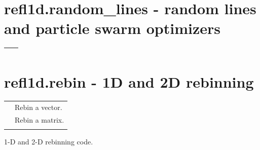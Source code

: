 \documentclass[letterpaper,10pt,english]{sphinxmanual}
\begin{document}
\section{refl1d.random\_lines - random lines and particle swarm optimizers}
\label{api/random_lines::doc}\label{api/random_lines:refl1d-random-lines-random-lines-and-particle-swarm-optimizers}
\begin{tabulary}{\linewidth}{LL}
\hline

{\hyperref[api/random_lines:refl1d.random_lines.random_lines]{}}
 & 

\\
\hline
\end{tabulary}

\label{api/random_lines:module-refl1d.random_lines}

\begin{fulllineitems}
\label{api/random_lines:refl1d.random_lines.random_lines}
\end{fulllineitems}



\section{refl1d.rebin - 1D and 2D rebinning}
\label{api/rebin:refl1d-rebin-1d-and-2d-rebinning}\label{api/rebin::doc}
\begin{tabulary}{\linewidth}{LL}
\hline

{\hyperref[api/rebin:refl1d.rebin.rebin]{}}
 & 
Rebin a vector.
\\

{\hyperref[api/rebin:refl1d.rebin.rebin2d]{}}
 & 
Rebin a matrix.
\\

{\hyperref[api/rebin:refl1d.rebin.test]{}}
 & 

\\
\hline
\end{tabulary}

\label{api/rebin:module-refl1d.rebin}
1-D and 2-D rebinning code.
\end{document}
